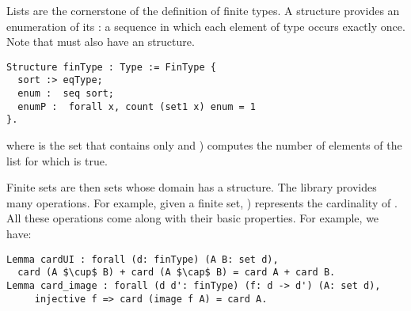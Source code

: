 Lists are the cornerstone of the definition of finite types.  A
 structure provides an enumeration of its : a
sequence in which each element of type  occurs exactly once.
Note that  must also have an  structure.

\begin{lstlisting}
Structure finType : Type := FinType {
  sort :> eqType;
  enum :  seq sort;
  enumP :  forall x, count (set1 x) enum = 1
}.
\end{lstlisting}
where  is the set that contains only  and 
) computes the number of elements
 of the list  for which  is true.

Finite sets are then sets whose domain has a 
structure. The library provides many  operations.  For example,
given  a finite set, ) represents the cardinality of
.  All these operations come along with their basic
properties. For example, we have:
\begin{lstlisting}
Lemma cardUI : forall (d: finType) (A B: set d), 
  card (A $\cup$ B) + card (A $\cap$ B) = card A + card B.
Lemma card_image : forall (d d': finType) (f: d -> d') (A: set d), 
     injective f => card (image f A) = card A.
\end{lstlisting}

